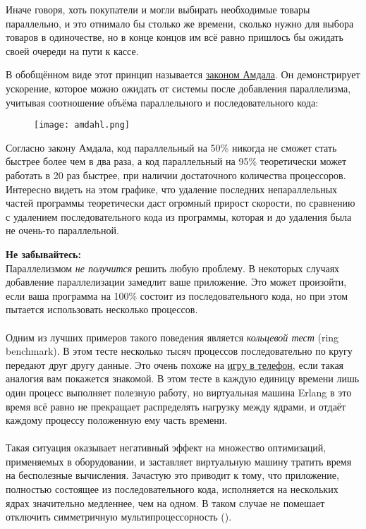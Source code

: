 Иначе говоря, хоть покупатели и могли выбирать необходимые товары параллельно, и это отнимало бы столько же времени, сколько нужно для выбора товаров в одиночестве, но в конце концов им всё равно пришлось бы ожидать своей очереди на пути к кассе.

В обобщённом виде этот принцип называется \href{http://en.wikipedia.org/wiki/Amdahl\%27s_law}{законом Амдала}.
Он демонстрирует ускорение, которое можно ожидать от системы после добавления параллелизма, учитывая соотношение объёма параллельного и последовательного кода:

\begin{figure}[h!]
    \centering
    \texttt{[image: amdahl.png]}
\end{figure}
Согласно закону Амдала, код параллельный на 50\% никогда не сможет стать быстрее более чем в два раза, а код параллельный на 95\% теоретически может работать в 20 раз быстрее, при наличии достаточного количества процессоров.
Интересно видеть на этом графике, что удаление последних непараллельных частей программы теоретически даст огромный прирост скорости, по сравнению с удалением последовательного кода из программы, которая и до удаления была не очень\--то параллельной.\\
\colorbox{lorange}
{
\begin{minipage}{1.0\linewidth}
    \textbf{Не забывайтесь:}\\
    Параллелизмом \emph{не получится} решить любую проблему.
    В некоторых случаях добавление параллелизации замедлит ваше приложение.
    Это может произойти, если ваша программа на 100\% состоит из последовательного кода, но при этом пытается использовать несколько процессов.\\
    \\
    Одним из лучших примеров такого поведения является \emph{кольцевой тест} (ring benchmark).
    В этом тесте несколько тысяч процессов последовательно по кругу передают друг другу данные.
    Это очень похоже на \href{http://en.wikipedia.org/wiki/Telephone_game}{игру в телефон}, если такая аналогия вам покажется знакомой.
    В этом тесте в каждую единицу времени лишь один процесс выполняет полезную работу, но виртуальная машина Erlang в это время всё равно не прекращает распределять нагрузку между ядрами, и отдаёт каждому процессу положенную ему часть времени.\\
    \\
    Такая ситуация оказывает негативный эффект на множество оптимизаций, применяемых в оборудовании, и заставляет виртуальную машину тратить время на бесполезные вычисления.
    Зачастую это приводит к тому, что приложение, полностью состоящее из последовательного кода, исполняется на нескольких ядрах значительно медленнее, чем на одном.
    В таком случае не помешает отключить симметричную мультипроцессорность ().
\end{minipage}
}
